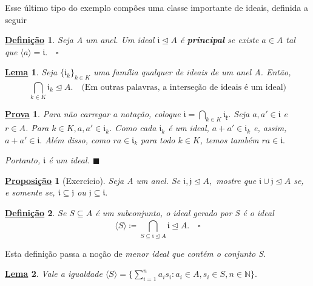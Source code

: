 \documentclass{article}
\newtheorem*{def*}{\underline{Defini\c c\~ao}}
\newtheorem*{lemma*}{\underline{Lema}}
\newtheorem*{prop*}{\underline{Proposi\c c\~ao}}
\newtheorem*{proof*}{\underline{Prova}}
\renewcommand\qedsymbol{$\blacksquare$}
\begin{document}
  Esse último tipo do exemplo compões uma classe importante de ideais, definida a seguir
\begin{def*}
  Seja A um anel. Um ideal \(\mathfrak{i}\trianglelefteq{A}\) é \textbf{principal} se existe \(a\in A\) tal que \(\langle a \rangle = \mathfrak{i}.\quad\square\)
\end{def*}
\begin{lemma*}
  Seja \(\{\mathfrak{i}_{k}\}_{k\in K}\) uma família qualquer de ideais de um anel A. Então, 
  \[
    \bigcap_{k\in K}^{}{\mathfrak{i}_{k}}\trianglelefteq{A}.\quad \text{(Em outras palavras, a interseção de ideais é um ideal)}
  \]
\end{lemma*}
\begin{proof*}
  Para não carregar a notação, coloque \(\mathfrak{i} = \bigcap_{k\in K}^{}{\mathfrak{i_{k}}}.\) Seja \(a, a'\in \mathfrak{i}\) e \(r\in A\).
Para \(k\in K, a, a'\in \mathfrak{i}_{k}\). Como cada \(\mathfrak{i}_{k}\) é um ideal, \(a + a'\in \mathfrak{i}_{k}\) e, assim,
 \(a + a'\in \mathfrak{i}.\) Além disso, como \(ra\in \mathfrak{i}_{k}\) para todo \(k\in K\), temos também \(ra \in \mathfrak{i}.\)

 Portanto, \(\mathfrak{i}\) é um ideal. \qedsymbol
\end{proof*}
\begin{prop*}[Exercício]
  Seja A um anel. Se \(\mathfrak{i}, \mathfrak{j}\trianglelefteq{A},\) mostre que \(\mathfrak{i}\cup \mathfrak{j}\trianglelefteq{A}\) se, e somente se,
 \(\mathfrak{i}\subseteq{\mathfrak{j}}\) ou \(\mathfrak{j}\subseteq{\mathfrak{i}}.\)
\end{prop*}
\begin{def*}
  Se \(S\subseteq{A}\) é um subconjunto, o ideal gerado por S é o ideal 
  \[
    \langle S \rangle\coloneqq \bigcap_{S\subseteq{\mathfrak{i}}\trianglelefteq{A}}^{}{\mathfrak{i}} \trianglelefteq{A}.\quad\square
  \]
\end{def*}
  Esta definição passa a noção de \textit{menor ideal que contém o conjunto S.}
\begin{lemma*}
  Vale a igualdade \(\langle S \rangle = \{\sum\limits_{i=1}^{n}a_{i}s_{i}: a_{i}\in A, s_{i}\in S, n\in \mathbb{N}\}.\)
\end{lemma*}
\end{document}
